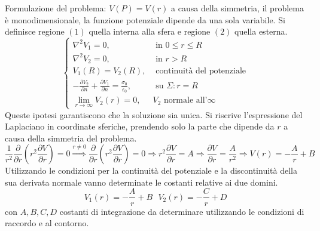 Formulazione del problema: $V(P) = V(r)$ a causa della simmetria, il problema
è monodimensionale, la funzione potenziale dipende da una sola variabile.
Si definisce regione $(1)$ quella interna alla sfera e regione $(2)$ quella esterna.
$$\begin{cases}
\nabla^2 V_1 = 0, & \text{ in } 0\leq r\leq R \\
\nabla^2 V_2 = 0, & \text{ in } r > R \\
V_1(R) = V_2(R), &\text{ continuità del potenziale} \\
-\frac{\partial V_2}{\partial n} + \frac{\partial V_1}{\partial n} = \frac{\sigma_0}{\varepsilon_0}, & \text{ su } \Sigma : r=R \\
\lim_{r\to\infty} V_2(r) = 0, & V_2 \text{ normale all'}\infty
\end{cases}
$$
Queste ipotesi garantiscono che la soluzione sia unica.
Si riscrive l'espressione del Laplaciano in coordinate sferiche, prendendo solo la parte
che dipende da $r$ a causa della simmetria del problema.
$$
\frac{1}{r^2}\frac{\partial}{\partial r} \left(r^2 \frac{\partial V}{\partial r}\right) = 0 \stackrel{r\neq 0}{\Rightarrow} \frac{\partial}{\partial r} \left(r^2 \frac{\partial V}{\partial r}\right) = 0 \Rightarrow r^2 \frac{\partial V}{\partial r} = A \Rightarrow
\frac{\partial V}{\partial r} = \frac{A}{r^2} \Rightarrow V(r) = -\frac{A}{r} + B
$$
Utilizzando le condizioni per la continuità del potenziale e la discontinuità della
sua derivata normale vanno determinate le costanti relative ai due domini.
$$
V_1(r) = -\frac{A}{r} + B \ \ \ V_2(r) = -\frac{C}{r} + D
$$
con $A,B,C,D$ costanti di integrazione da determinare utilizzando le condizioni
di raccordo e al contorno.
